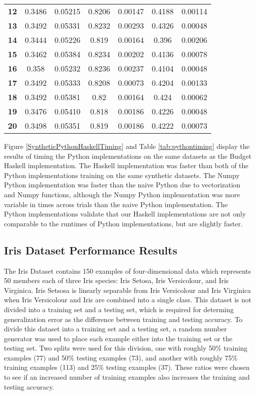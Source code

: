 \begin{table}[p]
\begin{center}
\begin{tabular}{l|c|c|c|c|c|c}
  \textbf{12} & 0.3486 & 0.05215 & 0.8206 & 0.00147 & 0.4188 & 0.00114\\
  \textbf{13} & 0.3492 & 0.05331 & 0.8232 & 0.00293 & 0.4326 & 0.00048\\
  \textbf{14} & 0.3444 & 0.05226 & 0.819 & 0.00164 & 0.396 & 0.00206\\
  \textbf{15} & 0.3462 & 0.05384 & 0.8234 & 0.00202 & 0.4136 & 0.00078\\
  \textbf{16} & 0.358 & 0.05232 & 0.8236 & 0.00237 & 0.4104 & 0.00048\\
  \textbf{17} & 0.3492 & 0.05333 & 0.8208 & 0.00073 & 0.4204 & 0.00133\\
  \textbf{18} & 0.3492 & 0.05381 & 0.82 & 0.00164 & 0.424 & 0.00062\\
  \textbf{19} & 0.3476 & 0.05410 & 0.818 & 0.00186 & 0.4226 & 0.00048\\
  \textbf{20} & 0.3498 & 0.05351 & 0.819 & 0.00186 & 0.4222 & 0.00073\\
  \end{tabular}
 \end{center}
\end{table}

Figure \ref{SyntheticPythonHaskellTiming} and Table \ref{tab:pythontiming} display the results of timing the Python implementations on the same datasets as the Budget Haskell implementation. The Haskell implementation was faster than both of the Python implementations training on the same synthetic datasets. The Numpy Python implementation was faster than the naive Python due to vectorization and Numpy functions, although the Numpy Python implementation was more variable in times across trials than the naive Python implementation. The Python implementations validate that our Haskell implementations are not only comparable to the runtimes of Python implementations, but are slightly faster.

\subsection{Iris Dataset Performance Results}\label{IrisResults}
The Iris Dataset \cite{Fis36} contains 150 examples of four-dimensional data which represents 50 members each of three Iris species: Iris Setosa, Iris Versicolour, and Iris Virginica. Iris Setsosa is linearly separable from Iris Versicolour and Iris Virginica when Iris Versicolour and Iris are combined into a single class. This dataset is not divided into a training set and a testing set, which is required for determing generalization error as the difference between training and testing accuracy. To divide this dataset into a training set and a testing set, a random number generator was used to place each example either into the training set or the testing set. Two splits were used for this division, one with roughly 50\% training examples (77) and 50\% testing examples (73), and another with roughly 75\% training examples (113) and 25\% testing examples (37). These ratios were chosen to see if an increased number of training examples also increases the training and testing accuracy.

